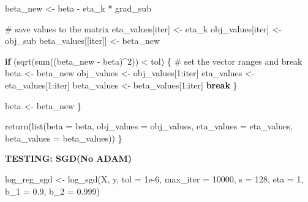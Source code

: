 \documentclass[
  letterpaper,
  DIV=11,
  numbers=noendperiod]{scrartcl}
\newenvironment{Shaded}{\begin{snugshade}}{\end{snugshade}}
\newcommand{\AttributeTok}[1]{\textcolor[rgb]{0.40,0.45,0.13}{#1}}
\newcommand{\CommentTok}[1]{\textcolor[rgb]{0.37,0.37,0.37}{#1}}
\newcommand{\ControlFlowTok}[1]{\textcolor[rgb]{0.00,0.23,0.31}{\textbf{#1}}}
\newcommand{\DecValTok}[1]{\textcolor[rgb]{0.68,0.00,0.00}{#1}}
\newcommand{\FloatTok}[1]{\textcolor[rgb]{0.68,0.00,0.00}{#1}}
\newcommand{\FunctionTok}[1]{\textcolor[rgb]{0.28,0.35,0.67}{#1}}
\newcommand{\NormalTok}[1]{\textcolor[rgb]{0.00,0.23,0.31}{#1}}
\newcommand{\OtherTok}[1]{\textcolor[rgb]{0.00,0.23,0.31}{#1}}
\newcommand{\SpecialCharTok}[1]{\textcolor[rgb]{0.37,0.37,0.37}{#1}}
\begin{document}
\begin{Shaded}
\begin{Highlighting}[]
\NormalTok{    beta\_new }\OtherTok{\textless{}{-}}\NormalTok{ beta }\SpecialCharTok{{-}}\NormalTok{ eta\_k }\SpecialCharTok{*}\NormalTok{ grad\_sub}
    
    \CommentTok{\# save values to the matrix}
\NormalTok{    eta\_values[iter] }\OtherTok{\textless{}{-}}\NormalTok{ eta\_k}
\NormalTok{    obj\_values[iter] }\OtherTok{\textless{}{-}}\NormalTok{ obj\_sub}
\NormalTok{    beta\_values[[iter]] }\OtherTok{\textless{}{-}}\NormalTok{ beta\_new}
    
    \ControlFlowTok{if}\NormalTok{ (}\FunctionTok{sqrt}\NormalTok{(}\FunctionTok{sum}\NormalTok{((beta\_new }\SpecialCharTok{{-}}\NormalTok{ beta)}\SpecialCharTok{\^{}}\DecValTok{2}\NormalTok{)) }\SpecialCharTok{\textless{}}\NormalTok{ tol) \{}
      \CommentTok{\# set the vector ranges and break}
\NormalTok{      beta }\OtherTok{\textless{}{-}}\NormalTok{ beta\_new}
\NormalTok{      obj\_values }\OtherTok{\textless{}{-}}\NormalTok{ obj\_values[}\DecValTok{1}\SpecialCharTok{:}\NormalTok{iter]}
\NormalTok{      eta\_values }\OtherTok{\textless{}{-}}\NormalTok{ eta\_values[}\DecValTok{1}\SpecialCharTok{:}\NormalTok{iter]}
\NormalTok{      beta\_values }\OtherTok{\textless{}{-}}\NormalTok{ beta\_values[}\DecValTok{1}\SpecialCharTok{:}\NormalTok{iter]}
      \ControlFlowTok{break}
\NormalTok{    \}}
    
\NormalTok{    beta }\OtherTok{\textless{}{-}}\NormalTok{ beta\_new}
\NormalTok{  \}}
  
  \FunctionTok{return}\NormalTok{(}\FunctionTok{list}\NormalTok{(}\AttributeTok{beta =}\NormalTok{ beta, }\AttributeTok{obj\_values =}\NormalTok{ obj\_values, }\AttributeTok{eta\_values =}\NormalTok{ eta\_values, }\AttributeTok{beta\_values =}\NormalTok{ beta\_values))}
\NormalTok{\}}
\end{Highlighting}
\end{Shaded}

\textbf{TESTING: SGD(No ADAM)}

\begin{Shaded}
\begin{Highlighting}[]
\NormalTok{log\_reg\_sgd }\OtherTok{\textless{}{-}} \FunctionTok{log\_sgd}\NormalTok{(X, y, }\AttributeTok{tol =} \FloatTok{1e{-}6}\NormalTok{, }\AttributeTok{max\_iter =} \DecValTok{10000}\NormalTok{, }\AttributeTok{s =} \DecValTok{128}\NormalTok{, }\AttributeTok{eta =} \DecValTok{1}\NormalTok{, }\AttributeTok{b\_1 =} \FloatTok{0.9}\NormalTok{, }\AttributeTok{b\_2 =} \FloatTok{0.999}\NormalTok{)}
\end{Highlighting}
\end{Shaded}
\end{document}
